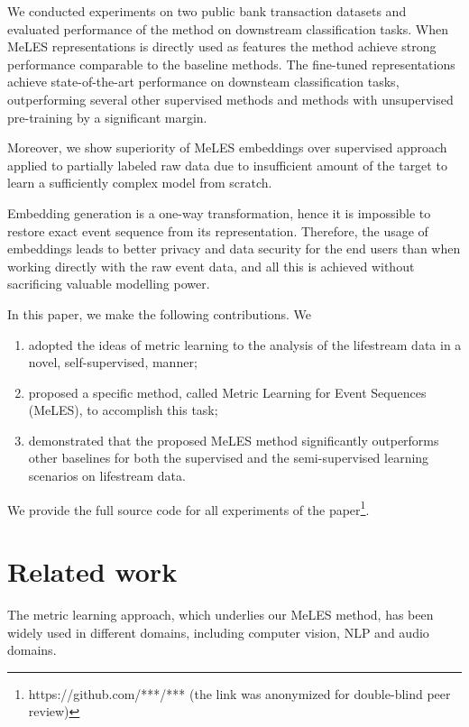 \documentclass{article}
\begin{document}
We conducted experiments on two public bank transaction datasets and evaluated performance of the method on downstream classification tasks. When MeLES representations is directly used as features the method achieve strong performance comparable to the baseline methods. The fine-tuned representations achieve state-of-the-art performance on downsteam classification tasks, outperforming several other supervised methods and methods with unsupervised pre-training by a significant margin.

Moreover, we show superiority of MeLES embeddings over supervised approach applied to partially labeled raw data due to insufficient amount of the target to learn a sufficiently complex model from scratch.

Embedding generation is a one-way transformation, hence it is impossible to restore exact event sequence from its representation. Therefore, the usage of embeddings leads to better privacy and data security for the end users than when working directly with the raw event data, and all this is achieved without sacrificing valuable modelling power.

In this paper, we make the following contributions. We
\begin{enumerate}
    \item adopted the ideas of metric learning to the analysis of the lifestream data in a novel, self-supervised, manner;
    \item proposed a specific method, called Metric Learning for Event Sequences (MeLES), to accomplish this task; 
    \item demonstrated that the proposed MeLES method significantly outperforms other baselines for both the supervised and the semi-supervised learning scenarios on lifestream data.
\end{enumerate}

We provide the full source code for all experiments of the paper\footnote{https://github.com/***/*** (the link was anonymized for double-blind peer review)}.

\section{Related work} \label{sec-rel-work}

The metric learning approach, which underlies our MeLES method, has been widely used in different domains, including computer vision, NLP and audio domains. 
\end{document}
